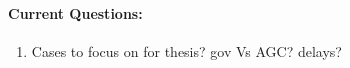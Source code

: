 \documentclass[12pt]{article}
\begin{document}
\begin{multicols}{2}
	\paragraph{Current Questions:}
	\begin{enumerate}
\itemsep0em 
	\item Cases to focus on for thesis?
	\subitem gov Vs AGC?
	\subitem delays?
	\end{enumerate}
	



\begin{comment}
\paragraph{Future Tasks:} %
	\begin{enumerate}
		
		\item Add import mirror / bypass mirror init sequence option to prevent repeated mirror creations.

		\item Bring wind into simulation \\ (ramp ungoverned generators?)


		
	\end{enumerate}
\paragraph{Future Work: (not by me)}
\begin{itemize}
\item Find best/correct way to trip gens in PSLF from python.
\item Account for different types of loads better. (exponential load model) %
\item Work to incorporate Matt's \emph{Suggested Use Cases} into simulation.
		\begin{itemize}
		\item Add Shunt Group Agent
		\item Work to Define Definite Time Controller user input
		\end{itemize} 


		\item Investigate ULTC action.

		\item Create an agent for every object: \\ ULTC, SVD, Transformer, \ldots


\end{comment}
\end{multicols}
\end{document}
